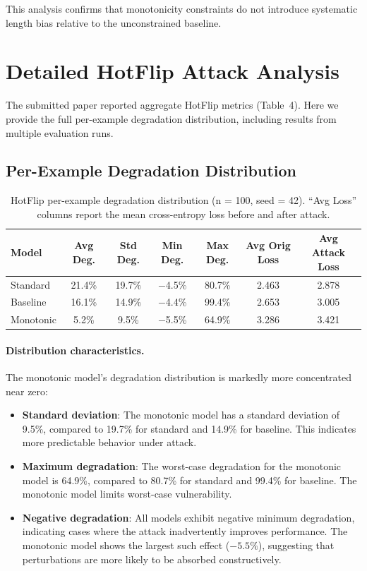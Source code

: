 \documentclass{article}
\begin{document}
This analysis confirms that monotonicity constraints do not introduce systematic length bias relative to the unconstrained baseline.


\section{Detailed HotFlip Attack Analysis}
\label{sec:hotflip-detail}

The submitted paper reported aggregate HotFlip metrics (Table~4). Here we provide the full per-example degradation distribution, including results from multiple evaluation runs.

\subsection{Per-Example Degradation Distribution}

\begin{table}[h]
\caption{HotFlip per-example degradation distribution (n = 100, seed = 42). ``Avg Loss'' columns report the mean cross-entropy loss before and after attack.}
\label{tab:hotflip-detail}
\centering
\begin{tabular}{lcccccc}
\toprule
Model & Avg Deg. & Std Deg. & Min Deg. & Max Deg. & Avg Orig Loss & Avg Attack Loss \\
\midrule
Standard  & 21.4\% & 19.7\% & $-$4.5\% & 80.7\% & 2.463 & 2.878 \\
Baseline  & 16.1\% & 14.9\% & $-$4.4\% & 99.4\% & 2.653 & 3.005 \\
Monotonic &  5.2\% &  9.5\% & $-$5.5\% & 64.9\% & 3.286 & 3.421 \\
\bottomrule
\end{tabular}
\end{table}

\paragraph{Distribution characteristics.} The monotonic model's degradation distribution is markedly more concentrated near zero:
\begin{itemize}
    \item \textbf{Standard deviation}: The monotonic model has a standard deviation of 9.5\%, compared to 19.7\% for standard and 14.9\% for baseline. This indicates more predictable behavior under attack.
    \item \textbf{Maximum degradation}: The worst-case degradation for the monotonic model is 64.9\%, compared to 80.7\% for standard and 99.4\% for baseline. The monotonic model limits worst-case vulnerability.
    \item \textbf{Negative degradation}: All models exhibit negative minimum degradation, indicating cases where the attack inadvertently improves performance. The monotonic model shows the largest such effect ($-5.5\%$), suggesting that perturbations are more likely to be absorbed constructively.
\end{itemize}
\end{document}
